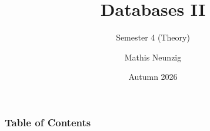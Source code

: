 \documentclass[10pt]{beamer}
\title[Databases II]{Databases II}
\subtitle{Semester 4 (Theory)}
\author[Neunzig, M.]{Mathis Neunzig}
\institute[DHBW Mosbach]{DHBW Mosbach}
\date[Autumn 2026]{Autumn 2026}
\begin{document}
\frame{\titlepage}

\begin{frame}
  \frametitle{Table of Contents}
  \tableofcontents
\end{frame}







\end{document}
